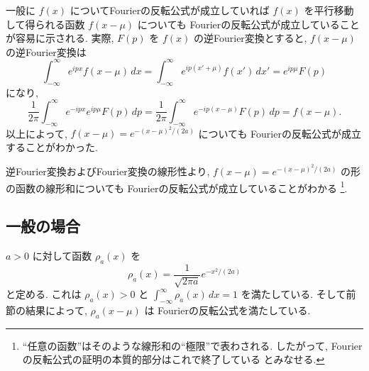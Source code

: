 \documentclass[12pt,twoside]{jarticle}
\theoremstyle{jplain}
\theoremstyle{jplain}
\theoremstyle{jplain}
\numberwithin{theorem}{section}
\numberwithin{equation}{section}
\numberwithin{figure}{section}
\numberwithin{table}{section}
\begin{document}
一般に $f(x)$ についてFourierの反転公式が成立していれば
$f(x)$ を平行移動して得られる函数 $f(x-\mu)$ についても
Fourierの反転公式が成立していることが容易に示される.
実際, $F(p)$ を $f(x)$ の逆Fourier変換とすると,
$f(x-\mu)$ の逆Fourier変換は
\[
\int_{-\infty}^\infty e^{ipx} f(x-\mu)\,dx
=\int_{-\infty}^\infty e^{ip(x'+\mu)} f(x')\,dx'
=e^{ip\mu}F(p)
\]
になり,
\[
\frac{1}{2\pi}\int_{-\infty}^\infty e^{-ipx}e^{ip\mu}F(p)\,dp
=\frac{1}{2\pi}\int_{-\infty}^\infty e^{-ip(x-\mu)}F(p)\,dp
=f(x-\mu).
\]
以上によって, $f(x-\mu)=e^{-(x-\mu)^2/(2a)}$ についても
Fourierの反転公式が成立することがわかった.

逆Fourier変換およびFourier変換の線形性より,
$f(x-\mu)=e^{-(x-\mu)^2/(2a)}$ の形の函数の線形和についても
Fourierの反転公式が成立していることがわかる%
\footnote{``任意の函数''はそのような線形和の``極限''で表わされる.
したがって, Fourierの反転公式の証明の本質的部分はこれで終了している
とみなせる.}.


\subsection{一般の場合}
\label{sec:generalcase}

$a>0$ に対して函数 $\rho_a(x)$ を
\[
\rho_a(x) = \frac{1}{\sqrt{2\pi a}}e^{-x^2/(2a)}
\]
と定める. これは $\rho_a(x)>0$ と $\int_{-\infty}^\infty \rho_a(x)\,dx=1$
を満たしている. そして前節の結果によって, $\rho_a(x-\mu)$ は
Fourierの反転公式を満たしている.
\end{document}

